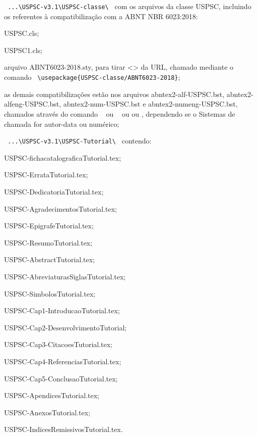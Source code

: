\begin{alineas}
	\item \verb+ ...\USPSC-v3.1\USPSC-classe\ + com os arquivos da classe USPSC, incluindo os referentes \`a compatibiliza\c{c}\~ao com a ABNT NBR 6023:2018:
		\begin{alineas}
			\item USPSC.cls;
			\item USPSC1.cls; 
			\item arquivo ABNT6023-2018.sty, para tirar <> da URL, chamado mediante o comando  \verb+ \usepackage{USPSC-classe/ABNT6023-2018}+;
			\item as demais compatibiliza\c{c}\~oes est\~ao nos arquivos abntex2-alf-USPSC.bst, abntex2-alfeng-USPSC.bst, abntex2-num-USPSC.bst e abntex2-numeng-USPSC.bst, chamados atrav\'es do comando \newline \verb+ + ou \newline
			\verb+ + ou \newline
			\verb++ ou \newline \verb++, dependendo se o Sistemas de chamada for autor-data ou num\'erico; 
		\end{alineas}	
	    
	\item \verb+ ...\USPSC-v3.1\USPSC-Tutorial\ + contendo:
		\begin{subalineas}
			\item USPSC-fichacatalograficaTutorial.tex;
			\item USPSC-ErrataTutorial.tex;
			\item USPSC-DedicatoriaTutorial.tex;
			\item USPSC-AgradecimentosTutorial.tex;
			\item USPSC-EpigrafeTutorial.tex;
			\item USPSC-ResumoTutorial.tex;
			\item USPSC-AbstractTutorial.tex;
			\item USPSC-AbreviaturasSiglasTutorial.tex;
			\item USPSC-SimbolosTutorial.tex;
			\item USPSC-Cap1-IntroducaoTutorial.tex;
			\item USPSC-Cap2-DesenvolvimentoTutorial;
			\item USPSC-Cap3-CitacoesTutorial.tex;
			\item USPSC-Cap4-ReferenciasTutorial.tex;
			\item USPSC-Cap5-ConclusaoTutorial.tex;
			\item USPSC-ApendicesTutorial.tex;
			\item USPSC-AnexosTutorial.tex;
			\item USPSC-IndicesRemissivosTutorial.tex.
		\end{subalineas}
	

\end{alineas}
